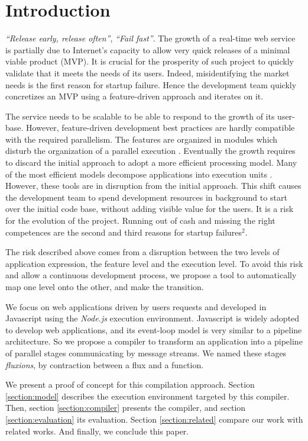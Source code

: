 \section{Introduction}

\textit{``Release early, release often''}, \textit{``Fail fast''}.
The growth of a real-time web service is partially due to Internet's capacity to allow very quick releases of a minimal viable product (MVP).
It is crucial for the prosperity of such project to quickly validate that it meets the needs of its users.
Indeed, misidentifying the market needs is the first reason for startup failure.
Hence the development team quickly concretizes an MVP using a feature-driven approach and iterates on it.

The service needs to be scalable to be able to respond to the growth of its user-base.
However, feature-driven development best practices are hardly compatible with the required parallelism.
The features are organized in modules which disturb the organization of a parallel execution \cite{Clements2013a,Hughes1989,Parnas1972}.
Eventually the growth requires to discard the initial approach to adopt a more efficient processing model.
Many of the most efficient models decompose applications into execution units \cite{Fox1997, Welsh2000, Dean2008}.
However, these tools are in disruption from the initial approach.
This shift causes the development team to spend development resources in background to start over the initial code base, without adding visible value for the users.
It is a risk for the evolution of the project.
Running out of cash and missing the right competences are the second and third reasons for startup failures$^2$.

The risk described above comes from a disruption between the two levels of application expression, the feature level and the execution level.
To avoid this risk and allow a continuous development process, we propose a tool to automatically map one level onto the other, and make the transition.

We focus on web applications driven by users requests and developed in Javascript using the \textit{Node.js} execution environment.
Javascript is widely adopted to develop web applications, and its event-loop model is very similar to a pipeline architecture.
So we propose a compiler to transform an application into a pipeline of parallel stages communicating by message streams.
We named these stages \textit{fluxions}, by contraction between a flux and a function.

We present a proof of concept for this compilation approach.
Section \ref{section:model} describes the execution environment targeted by this compiler.
Then, section \ref{section:compiler} presents the compiler, and section \ref{section:evaluation} its evaluation.
Section \ref{section:related} compare our work with related works.
And finally, we conclude this paper.